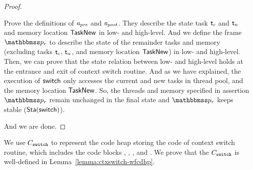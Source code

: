 \begin{proof}
\begin{itemize}
        Prove the definitions of $\textit{a}_\textit{pre}$ and $\textit{a}_\textit{post}$. 
        They describe the state task $\textsf{t}_c$ and $\textsf{t}_n$
        and memory location $\mathsf{TaskNew}$
        in low- and high-level. And we define the frame 
        $\relastP_r$ to describe the state of the 
        remainder tasks and memory 
        (excluding tasks $\textsf{t}_c$, $\textsf{t}_n$, and 
        memory location $\mathsf{TaskNew}$) in low- and high-level.
        Then, we can prove that the 
        state relation between low- and high-level 
        holds at the entrance and 
        exit of context switch routine. 
        And as we have explained, the execution of 
        $\mathsf{switch}$ only accesses 
        the current and new tasks in thread pool, and the 
        memory location $\mathsf{TaskNew}$. So, 
        the threads and memory specified in assertion 
        $\relastP_r$ remain unchanged 
        in the final state and $\relastP_r$ keeps 
        stable ($\textsf{Sta}(\mathsf{switch})$).
    \end{itemize}
    And we are done. 
\end{proof}

We use $C_{\texttt{switch}}$ to represent the 
code heap storing the code of context switch routine, 
which includes the code blocks \SwitchEntry{}, 
\regsave{}, \regrestore{}, 
\SaveUsedWin{} and \SwitchNewTask{}. We prove that 
the $C_{\texttt{switch}}$ is well-defined in 
Lemma~\ref{lemma:ctxswitch-wfcdhp}.

